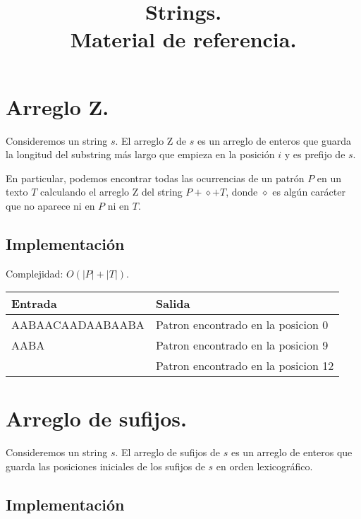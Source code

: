 \documentclass[12pt, letterpaper, twoside]{article}
\title{Strings.\\
	  \large Material de referencia.}
\author{}
\date{}
\begin{document}
\maketitle

\tableofcontents

\newpage

\section{Arreglo Z.}

Consideremos un string $s$. El arreglo Z de $s$ es un arreglo de enteros que guarda la longitud del substring más largo que empieza en la posición $i$ y es prefijo de $s$. 

En particular, podemos encontrar todas las ocurrencias de un patrón $P$ en un texto $T$ calculando el arreglo Z del string $P + \diamond + T$, donde $\diamond$ es algún carácter que no aparece ni en $P$ ni en $T$.

\subsection{Implementación}

Complejidad: $O(|P| + |T|)$.

 \medskip

\begin{tabular}{|p{7cm}|p{7cm}|}
\hline
\textbf{Entrada} & \textbf{Salida}\\ \hline
AABAACAADAABAABA & Patron encontrado en la posicion 0\\
AABA             & Patron encontrado en la posicion 9\\
                 & Patron encontrado en la posicion 12\\ \hline
\end{tabular}

\newpage

\section{Arreglo de sufijos.}

Consideremos un string $s$. El arreglo de sufijos de $s$ es un arreglo de enteros que guarda las posiciones iniciales de los sufijos de $s$ en orden lexicográfico.

\subsection{Implementación}
\end{document}
